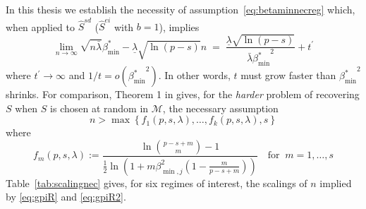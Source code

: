 \documentclass[
  12pt]{article}
\newcommand{\M}{\mathcal{M}}
\begin{document}
In this thesis we establish the necessity of assumption~\eqref{eq:betaminnecreg} which, when applied to $\hat{S}^{sd}$ ($\hat{S}^{ei}$ with $b=1$), implies
\begin{equation}\label{eq:gpiR}
\lim_{n\to\infty}\sqrt{n\bar{\lambda}}\beta_{\min}^*-\underline{\lambda}\sqrt{\ln(p-s)} n\;=\; \frac{\underline{\lambda}\sqrt{\ln(p-s)}}{\bar{\lambda}{\beta_{\min}^*}^2}+t^{\prime}
\end{equation}
where $t^{\prime} \to\infty$ and $1/t = o({\beta_{\min}^*}^2)$. In other words, $t$ must grow faster than ${\beta_{\min}^*}^2$ shrinks. For comparison, Theorem 1 in \cite{wang2010} gives, for the \textit{harder} problem of recovering $S$ when $S$ is chosen at random in $\M$, the necessary assumption 
\begin{equation}\label{eq:gpiR2}
n>\max \left\{f_1(p, s, \lambda), \ldots, f_k(p, s, \lambda), s\right\}
\end{equation}
where
$$
f_m(p, s, \lambda):=\frac{\ln \binom{p-s+m}{m}-1}{\frac{1}{2} \ln \left(1+m \beta_{\min,j}^2\left(1-\frac{m}{p-s+m}\right)\right)}\quad\text{for}\;\;m=1, \ldots, s
$$
Table~\ref{tab:scalingnec} gives, for six regimes of interest, the scalings of $n$ implied by \eqref{eq:gpiR} and \eqref{eq:gpiR2}. 
\end{document}
